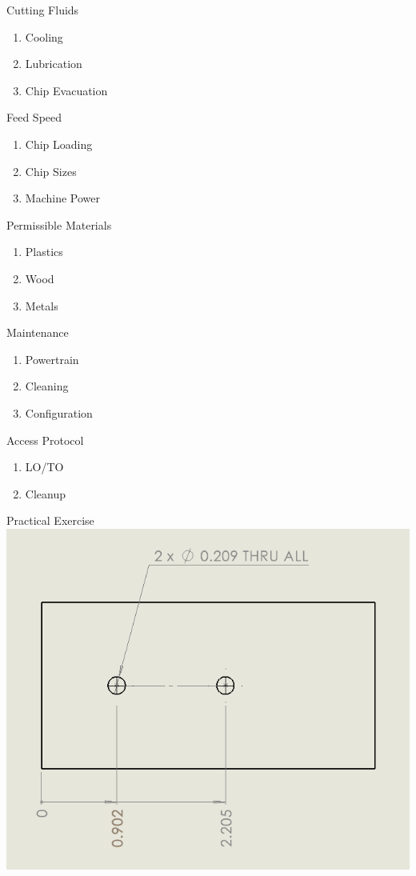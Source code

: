 \documentclass[aspectratio=169]{beamer}
\begin{document}
\begin{frame}{Cutting Fluids}
    \begin{enumerate}
        \item Cooling
        \item Lubrication
        \item Chip Evacuation
    \end{enumerate}
\end{frame}
\begin{frame}{Feed Speed}
    \begin{enumerate}
        \item Chip Loading
        \item Chip Sizes
        \item Machine Power
    \end{enumerate}
\end{frame}
\begin{frame}{Permissible Materials}
    \begin{enumerate}
        \item Plastics
        \item Wood
        \item Metals
    \end{enumerate}
\end{frame}
\begin{frame}{Maintenance}
    \begin{enumerate}
        \item Powertrain
        \item Cleaning
        \item Configuration
    \end{enumerate}
\end{frame}
\begin{frame}{Access Protocol}
    \begin{enumerate}
        \item LO/TO
        \item Cleanup
    \end{enumerate}
\end{frame}
\begin{frame}{Practical Exercise}
    \centering
    \includegraphics[height=0.7\textheight]{exercise1.png}
\end{frame}
\end{document}

